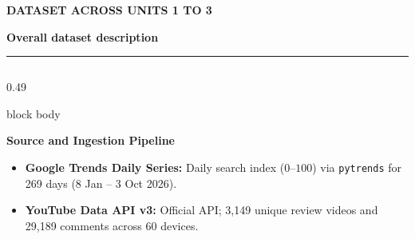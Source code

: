 \documentclass[aspectratio=169, 10pt]{beamer}
\newcommand{\slideheader}[3]{%
        \vspace{-0.25cm}%
        \noindent\begin{minipage}[t]{0.88\linewidth}%
            {\fontsize{7pt}{8.5pt}\selectfont \textbf{\color{BlueAccent}#1}}\par\vspace{1pt}%
            {\fontsize{11.5pt}{13.5pt}\selectfont \textbf{\color{NavyPrimary}#2}}%
        \end{minipage}%
        \hfill%
        \begin{minipage}[t]{0.10\linewidth}%
            \raggedleft{\fontsize{12pt}{14pt}\selectfont \textbf{\color{CoralAccent}#3}}%
        \end{minipage}\par%
        \vspace{2pt}%
        \textcolor{CardBorder}{\rule{\linewidth}{0.6pt}}\par%
        \vspace{3pt}%
    }
\newenvironment{card}[1][]{%
        \begin{beamercolorbox}[rounded=true,shadow=false,wd=\linewidth,sep=3.5pt,#1]{block body}%
        \fontsize{7.8pt}{9.8pt}\selectfont%
    }{%
        \end{beamercolorbox}%
    }
\begin{document}
    \begin{frame}[t]                                                                                                                                                                                   
        \slideheader{DATASET ACROSS UNITS 1 TO 3}{Overall dataset description}{04}                                                                                                                     
        \begin{columns}[T]                                                                                                                                                                             
            \begin{column}{0.49\textwidth}                                                                                                                                                             
                \begin{card}                                                                                                                                                                           
                    \textbf{\color{NavyPrimary}Source and Ingestion Pipeline}\\[0.03cm]                                                                                                                
                    \begin{itemize}\setlength{\itemsep}{1.2pt}                                                                                                                                         
                        \item \textbf{Google Trends Daily Series:} Daily search index ($0$--$100$) via \texttt{pytrends} for 269 days (8 Jan -- 3 Oct 2026).                                 
                        \item \textbf{YouTube Data API v3:} Official API; 3,149 unique review videos and 29,189 comments across 60 devices.                                                 

\end{itemize}
\end{card}
\end{column}
\end{columns}
\end{frame}
\end{document}
